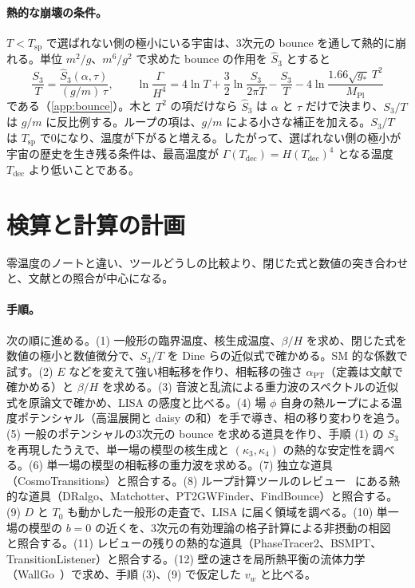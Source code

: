 \documentclass[a4paper,10pt]{ltjsarticle}
\begin{document}
\paragraph{熱的な崩壊の条件。}$T<T_{\mathrm{sp}}$ で選ばれない側の極小にいる宇宙は、3次元の bounce を通して熱的に崩れる。単位 $m^2/g$、$m^6/g^2$ で求めた bounce の作用を $\hat S_3$ とすると
\begin{equation}
\frac{S_3}{T}=\frac{\hat S_3(\alpha,\tau)}{(g/m)\,\tau},\qquad
\ln\frac{\Gamma}{H^4}=4\ln T+\frac32\ln\frac{S_3}{2\pi T}-\frac{S_3}{T}-4\ln\frac{1.66\sqrt{g_*}\,T^2}{M_{\mathrm{Pl}}}
\label{eq:s3single}
\end{equation}
である（\ref{app:bounce}）。木と $T^2$ の項だけなら $\hat S_3$ は $\alpha$ と $\tau$ だけで決まり、$S_3/T$ は $g/m$ に反比例する。ループの項は、$g/m$ による小さな補正を加える。$S_3/T$ は $T_{\mathrm{sp}}$ で0になり、温度が下がると増える。したがって、選ばれない側の極小が宇宙の歴史を生き残る条件は、最高温度が $\Gamma(T_{\mathrm{dec}})=H(T_{\mathrm{dec}})^4$ となる温度 $T_{\mathrm{dec}}$ より低いことである。

\section{検算と計算の計画}\label{sec:plan}

零温度のノートと違い、ツールどうしの比較より、閉じた式と数値の突き合わせと、文献との照合が中心になる。

\paragraph{手順。}次の順に進める。(1) 一般形の臨界温度、核生成温度、$\beta/H$ を求め、閉じた式を数値の極小と数値微分で、$S_3/T$ を Dine らの近似式で確かめる。SM 的な係数で試す。(2) $E$ などを変えて強い相転移を作り、相転移の強さ $\alpha_{\mathrm{PT}}$（定義は文献で確かめる）と $\beta/H$ を求める。(3) 音波と乱流による重力波のスペクトルの近似式を原論文で確かめ、LISA の感度と比べる。(4) 場 $\phi$ 自身の熱ループによる温度ポテンシャル（高温展開と daisy の和）を手で導き、相の移り変わりを追う。(5) 一般のポテンシャルの3次元の bounce を求める道具を作り、手順 (1) の $S_3$ を再現したうえで、単一場の模型の核生成と $(\kappa_3,\kappa_4)$ の熱的な安定性を調べる。(6) 単一場の模型の相転移の重力波を求める。(7) 独立な道具（CosmoTransitions）と照合する。(8) ループ計算ツールのレビュー~\cite{toolsreview} にある熱的な道具（DRalgo、Matchotter、PT2GWFinder、FindBounce）と照合する。(9) $D$ と $T_0$ も動かした一般形の走査で、LISA に届く領域を調べる。(10) 単一場の模型の $b=0$ の近くを、3次元の有効理論の格子計算による非摂動の相図~\cite{gould21} と照合する。(11) レビューの残りの熱的な道具（PhaseTracer2、BSMPT、TransitionListener）と照合する。(12) 壁の速さを局所熱平衡の流体力学（WallGo~\cite{wallgo}）で求め、手順 (3)、(9) で仮定した $v_w$ と比べる。
\end{document}
